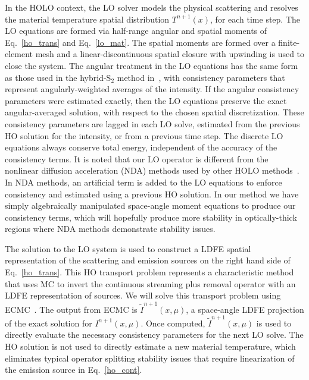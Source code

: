 \documentclass[11pt]{article}
\begin{document}
In the HOLO context, the LO solver models the physical scattering and
resolves the material temperature spatial distribution $T^{n+1}(x)$, for each time step.  The LO equations are formed via half-range 
angular and spatial moments of
Eq.~\eqref{ho_trans} and Eq.~\eqref{lo_mat}. The spatial moments are formed over a
finite-element
mesh and a linear-discontinuous spatial closure with upwinding is used to close the
system.  The angular treatment in the LO equations has the same form as those used in the
hybrid-S$_2$ method in~\cite{wolters},  with
consistency parameters that represent angularly-weighted averages of the intensity.
If the angular consistency parameters were estimated exactly, then
the LO equations preserve the exact angular-averaged solution,  with respect to the chosen
spatial discretization.  These consistency parameters are lagged in each LO solve,
estimated from the previous HO solution for the intensity, or from a previous time
step.  The discrete LO equations always conserve total energy, independent of the accuracy of the consistency terms.
It is noted that our LO operator is different from the nonlinear
diffusion acceleration (NDA) methods used by other HOLO methods~\cite{rmc,park,willert}.  In
NDA methods, an artificial term is added to the LO equations to enforce consistency and estimated using a
previous HO solution.  In our method we have simply algebraically 
manipulated space-angle moment equations to produce our consistency terms,
which will hopefully produce more
stability in optically-thick regions where NDA methods demonstrate stability issues.

The solution to the LO system is used to construct a LDFE spatial representation of
the scattering and emission sources on the right hand side of Eq.~\eqref{ho_trans}.
 This HO transport problem represents a characteristic method that uses MC to
invert the continuous streaming plus removal operator with an LDFE representation of
sources. We will solve this transport problem using ECMC~\cite{jake}.  The output from ECMC is
$\tilde{I}^{n+1}(x,\mu)$, a space-angle LDFE projection of the exact solution for
$I^{n+1}(x,\mu)$.  Once computed, $\tilde{I}^{n+1}(x,\mu)$ is used
to directly evaluate the necessary consistency parameters for the next LO solve.   The HO solution is not used to directly estimate a new
material temperature, which eliminates
typical operator splitting stability issues that require linearization of the
emission source in Eq.~\eqref{ho_cont}. 
\end{document}
